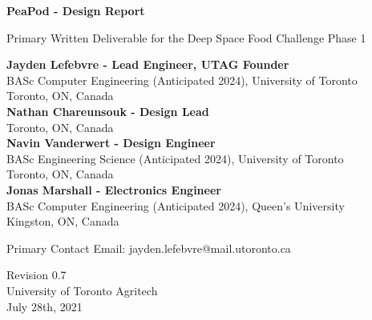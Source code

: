 \documentclass{report}
\begin{document}
\begin{titlepage}
    \begin{center}
        \vspace*{1.2cm}

        \textbf{\large{PeaPod - Design Report}}

        \vspace{0.5cm}

        Primary Written Deliverable for the Deep Space Food Challenge Phase 1

        \vfill \small{

            \textbf{Jayden Lefebvre - Lead Engineer, UTAG Founder}\\
            BASc Computer Engineering (Anticipated 2024), University of Toronto\\
            Toronto, ON, Canada\\
            \vspace{.5cm}
            \textbf{Nathan Chareunsouk - Design Lead}\\Toronto, ON, Canada\\
            \vspace{.5cm}
            \textbf{Navin Vanderwert - Design Engineer}\\
            BASc Engineering Science (Anticipated 2024), University of Toronto\\
            Toronto, ON, Canada\\
            \vspace{.5cm}
            \textbf{Jonas Marshall - Electronics Engineer}\\
            BASc Computer Engineering (Anticipated 2024), Queen's University\\
            Kingston, ON, Canada

        }

        \vspace{1cm}

        Primary Contact Email: jayden.lefebvre@mail.utoronto.ca

        \vspace{.75cm}

        Revision 0.7\\
        University of Toronto Agritech\\
        July 28th, 2021

    \end{center}
\end{titlepage}

\thispagestyle{plain}
\end{document}
